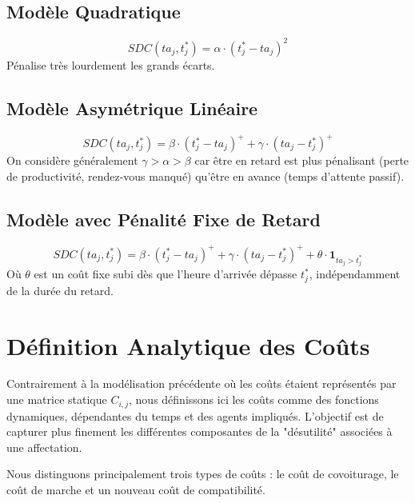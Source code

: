 \documentclass[12pt, a4paper]{article}
\begin{document}
\subsection{Modèle Quadratique}
$$ SDC(ta_j, t^*_j) = \alpha \cdot (t^*_j - ta_j)^2 $$
Pénalise très lourdement les grands écarts.

\subsection{Modèle Asymétrique Linéaire}
$$ SDC(ta_j, t^*_j) = \beta \cdot (t^*_j - ta_j)^+ + \gamma \cdot (ta_j - t^*_j)^+ $$
On considère généralement $\gamma > \alpha > \beta$ car être en retard est plus pénalisant (perte de productivité, rendez-vous manqué) qu'être en avance (temps d'attente passif).

\subsection{Modèle avec Pénalité Fixe de Retard}
$$ SDC(ta_j, t^*_j) = \beta \cdot (t^*_j - ta_j)^+ + \gamma \cdot (ta_j - t^*_j)^+ + \theta \cdot \mathbf{1}_{ta_j > t^*_j} $$
Où $\theta$ est un coût fixe subi dès que l'heure d'arrivée dépasse $t^*_j$, indépendamment de la durée du retard.

\section{Définition Analytique des Coûts}
Contrairement à la modélisation précédente où les coûts étaient représentés par une matrice statique $C_{i,j}$, nous définissons ici les coûts comme des fonctions dynamiques, dépendantes du temps et des agents impliqués. L'objectif est de capturer plus finement les différentes composantes de la "désutilité" associées à une affectation.

Nous distinguons principalement trois types de coûts : le coût de covoiturage, le coût de marche et un nouveau coût de compatibilité.
\end{document}
